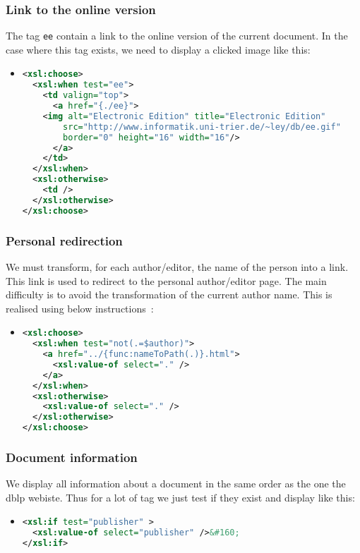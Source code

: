 \documentclass{article}
\begin{document}
    \subsubsection{Link to the online version}
      The tag \verb|ee| contain a link to the online version of the current document.  In the case where this tag exists, we need to display a clicked image like this:
      \begin{itemize}
	\item \begin{lstlisting}[language=XML]
<xsl:choose>
  <xsl:when test="ee">
    <td valign="top">
      <a href="{./ee}">
	<img alt="Electronic Edition" title="Electronic Edition"
	    src="http://www.informatik.uni-trier.de/~ley/db/ee.gif"
	    border="0" height="16" width="16"/>
      </a>
    </td>
  </xsl:when>
  <xsl:otherwise>
    <td />
  </xsl:otherwise>
</xsl:choose>\end{lstlisting}
      \end{itemize}
      
    \subsubsection{Personal redirection}
      We must transform, for each author/editor, the name of the person into a link. This link is used to redirect to the personal author/editor page. The main difficulty is to avoid the transformation of the current author name. This is realised using below instructions~:
      \begin{itemize}
	\item \begin{lstlisting}[language=XML]
<xsl:choose>
  <xsl:when test="not(.=$author)">
    <a href="../{func:nameToPath(.)}.html">
      <xsl:value-of select="." />
    </a>
  </xsl:when>
  <xsl:otherwise>
    <xsl:value-of select="." />
  </xsl:otherwise>
</xsl:choose>\end{lstlisting}
      \end{itemize}
      
    \subsubsection{Document information}
      We display all information about a document in the same order as the one the dblp webiste.  Thus for a lot of tag we just test if they exist and display like this:
      \begin{itemize}
	\item \begin{lstlisting}[language=XML]
<xsl:if test="publisher" >
  <xsl:value-of select="publisher" />&#160;
</xsl:if>\end{lstlisting}
      \end{itemize}
\end{document}

